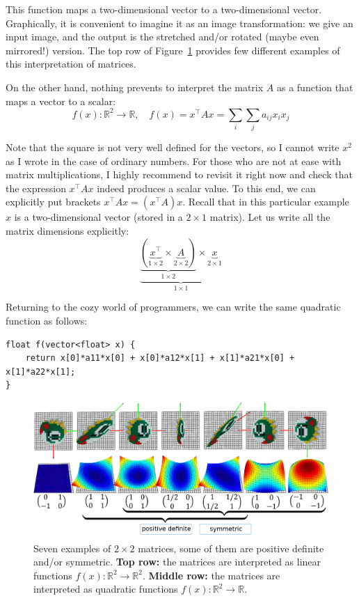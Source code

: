 \documentclass[notitlepage,oneside]{book}
\begin{document}
This function maps a two-dimensional vector to a two-dimensional vector.
Graphically, it is convenient to imagine it as an image transformation: we give an input image, and the output is the stretched and/or rotated (maybe even mirrored!) version.
The top row of Figure~\ref{fig:matrices} provides few different examples of this interpretation of matrices.

On the other hand, nothing prevents to interpret the matrix $A$ as a function that maps a vector to a scalar:
$$
f(x) : \mathbb R^2 \rightarrow \mathbb R, \quad f(x) = x^\top A x = \sum\limits_i\sum\limits_j a_{ij}x_i x_j
$$

Note that the square is not very well defined for the vectors, so I cannot write $x^2$ as I wrote in the case of ordinary numbers. 
For those who are not at ease with matrix multiplications, I highly recommend to revisit it right now and check that the expression $x^\top A x$ indeed produces a scalar value.
To this end, we can explicitly put brackets $x^\top A x = (x^\top A) x$.
Recall that in this particular example $x$ is a two-dimensional vector (stored in a $2\times 1$ matrix).
Let us write all the matrix dimensions explicitly:
$$
\underbrace{\underbrace{\left(\underbrace{x^\top}_{1\times 2} \times \underbrace{A}_{2\times 2}\right)}_{1\times 2} \times \underbrace{x}_{2\times 1}}_{1 \times 1}
$$

Returning to the cozy world of programmers, we can write the same quadratic function as follows:
\begin{verbatim}
float f(vector<float> x) {
    return x[0]*a11*x[0] + x[0]*a12*x[1] + x[1]*a21*x[0] + x[1]*a22*x[1];
}
\end{verbatim}

\begin{figure}[ht]
	\centering
	\includegraphics[width=\linewidth]{img/matrices}
	\caption{Seven examples of $2\times 2$ matrices, some of them are positive definite and/or symmetric. 
    \textbf{Top row:} the matrices are interpreted as linear functions $f(x):\mathbb R^2 \rightarrow \mathbb R^2$. \textbf{Middle row:} the matrices are interpreted as quadratic functions
 $f(x):\mathbb R^2 \rightarrow \mathbb R$.}
	\label{fig:matrices}
\end{figure}
\end{document}
